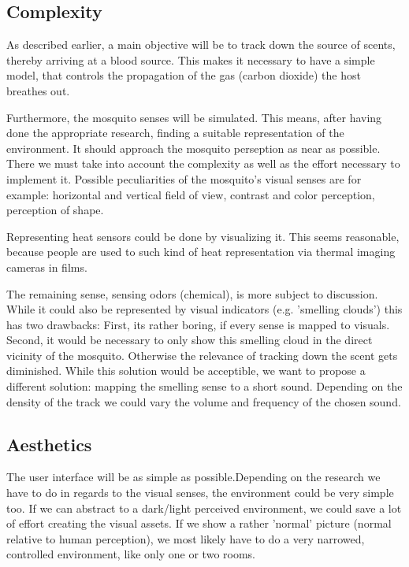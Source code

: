 \documentclass{acm_proc_article-sp}
\begin{document}
\subsection{Complexity}
As described earlier, a main objective will be to track down the source of scents, thereby arriving at a blood source. This makes it necessary to have a simple model, that controls the propagation of the gas (carbon dioxide) the host breathes out.

Furthermore, the mosquito senses will be simulated. This means, after having done the appropriate research, finding a suitable representation of the environment. It should approach the mosquito perseption as near as possible. There we must take into account the complexity as well as the effort necessary to implement it. Possible peculiarities of the mosquito's visual senses are for example: horizontal and vertical field of view, contrast and color perception, perception of shape. 

Representing heat sensors could be done by visualizing it. This seems reasonable, because people are used to such kind of heat representation via thermal imaging cameras in films.

The remaining sense, sensing odors (chemical), is more subject to discussion. While it could also be represented by visual indicators (e.g. 'smelling clouds') this has two drawbacks: First, its rather boring, if every sense is mapped to visuals. Second, it would be necessary to only show this smelling cloud in the direct vicinity of the mosquito. Otherwise the relevance of tracking down the scent gets diminished. While this solution would be acceptible, we want to propose a different solution: mapping the smelling sense to a short sound. Depending on the density of the track we could vary the volume and frequency of the chosen sound. 

\subsection{Aesthetics}
The user interface will be as simple as possible.Depending on the research we have to do in regards to the visual senses, the environment could be very simple too. If we can abstract to a dark/light perceived environment, we could save a lot of effort creating the visual assets. If we show a rather 'normal' picture (normal relative to human perception), we most likely have to do a very narrowed, controlled environment, like only one or two rooms.
\end{document}
